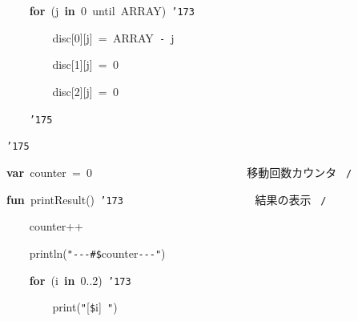 \documentclass[a4paper,10pt]{article}
\def\mc{\relax}
\begin{document}
\noindent
\mbox{}{\tt\mc \ }{\tt\mc \ }{\tt\mc \ }{\tt\mc \ }\textbf{for}{\tt\mc \ }(j{\tt\mc \ }\textbf{in}{\tt\mc \ }0{\tt\mc \ }until{\tt\mc \ }ARRAY){\tt\mc \ }{\tt\char'173}

\noindent
\mbox{}{\tt\mc \ }{\tt\mc \ }{\tt\mc \ }{\tt\mc \ }{\tt\mc \ }{\tt\mc \ }{\tt\mc \ }{\tt\mc \ }disc[0][j]{\tt\mc \ }={\tt\mc \ }ARRAY{\tt\mc \ }{\tt -}{\tt\mc \ }j

\noindent
\mbox{}{\tt\mc \ }{\tt\mc \ }{\tt\mc \ }{\tt\mc \ }{\tt\mc \ }{\tt\mc \ }{\tt\mc \ }{\tt\mc \ }disc[1][j]{\tt\mc \ }={\tt\mc \ }0

\noindent
\mbox{}{\tt\mc \ }{\tt\mc \ }{\tt\mc \ }{\tt\mc \ }{\tt\mc \ }{\tt\mc \ }{\tt\mc \ }{\tt\mc \ }disc[2][j]{\tt\mc \ }={\tt\mc \ }0

\noindent
\mbox{}{\tt\mc \ }{\tt\mc \ }{\tt\mc \ }{\tt\mc \ }{\tt\char'175}

\noindent
\mbox{}{\tt\char'175}

\noindent
\mbox{}\hfill

\noindent
\mbox{}\textbf{var}{\tt\mc \ }counter{\tt\mc \ }={\tt\mc \ }0{\tt\mc \ }{\tt\mc \ }{\tt\mc \ }{\tt\mc \ }{\tt\mc \ }{\tt\mc \ }{\tt\mc \ }{\tt\mc \ }{\tt\mc \ }{\tt\mc \ }{\tt\mc \ }{\tt\mc \ }{\tt\mc \ }{\tt\mc \ }{\tt\mc \ }{\tt\mc \ }{\tt\mc \ }{\tt\mc \ }{\tt\mc \ }{\tt\mc \ }{\tt\mc \ }{\tt\mc \ }{\tt\mc \ }{\tt\mc \ }{\tt\mc \ }\rm\mc {\tt /}{\tt *}\  \ 移動回数カウンタ \hfill \rm\mc \ {\tt *}{\tt /}
\tt\mc 

\noindent
\mbox{}\hfill

\noindent
\mbox{}\textbf{fun}{\tt\mc \ }printResult(){\tt\mc \ }{\tt\char'173}{\tt\mc \ }{\tt\mc \ }{\tt\mc \ }{\tt\mc \ }{\tt\mc \ }{\tt\mc \ }{\tt\mc \ }{\tt\mc \ }{\tt\mc \ }{\tt\mc \ }{\tt\mc \ }{\tt\mc \ }{\tt\mc \ }{\tt\mc \ }{\tt\mc \ }{\tt\mc \ }{\tt\mc \ }{\tt\mc \ }{\tt\mc \ }{\tt\mc \ }{\tt\mc \ }\rm\mc {\tt /}{\tt *}\  \ 結果の表示 \hfill \rm\mc \ {\tt *}{\tt /}
\tt\mc 

\noindent
\mbox{}{\tt\mc \ }{\tt\mc \ }{\tt\mc \ }{\tt\mc \ }counter++

\noindent
\mbox{}{\tt\mc \ }{\tt\mc \ }{\tt\mc \ }{\tt\mc \ }println({\tt "}{\tt -}{\tt -}{\tt -}{\tt\#}{\tt\$}counter{\tt -}{\tt -}{\tt -}{\tt "})

\noindent
\mbox{}{\tt\mc \ }{\tt\mc \ }{\tt\mc \ }{\tt\mc \ }\textbf{for}{\tt\mc \ }(i{\tt\mc \ }\textbf{in}{\tt\mc \ }0..2){\tt\mc \ }{\tt\char'173}

\noindent
\mbox{}{\tt\mc \ }{\tt\mc \ }{\tt\mc \ }{\tt\mc \ }{\tt\mc \ }{\tt\mc \ }{\tt\mc \ }{\tt\mc \ }print({\tt "}[{\tt\$}i]{\tt\mc \ }{\tt "})
\end{document}
